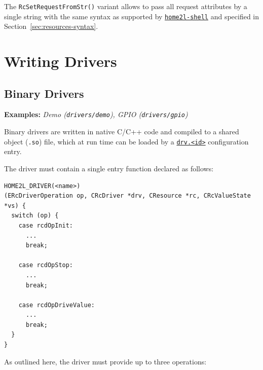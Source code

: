 \documentclass[12pt,english,parskip=half]{scrreprt}
\newcommand{\idx}[1]{#1\index{#1}}
\newcommand{\envref}[1]{\hyperref[env:#1]{\texttt{#1}}}        %
\newcommand{\toolref}[1]{\hyperref[tool:#1]{\texttt{\idx{#1}}}}
\begin{document}
The \texttt{RcSetRequestFromStr()} variant allows to pass all request attributes
by a single string with the same syntax as supported by
\toolref{home2l-shell} and specified in Section~\ref{sec:resources-syntax}.





%
\chapter{Writing Drivers}
\label{ch:drvdev}
%



\section{Binary Drivers}
\label{sec:drvdev-binary}


\textbf{Examples:} \emph{Demo (\texttt{drivers/demo}), GPIO (\texttt{drivers/gpio})}

Binary drivers are written in native C/C++ code and compiled to a shared
object (\texttt{.so}) file, which at run time can be loaded by a \envref{drv.<id>}
configuration entry.

The driver must contain a single entry function declared as follows:

\begin{lstlisting}
HOME2L_DRIVER(<name>) 
(ERcDriverOperation op, CRcDriver *drv, CResource *rc, CRcValueState *vs) {
  switch (op) {
    case rcdOpInit:
      ...
      break;

    case rcdOpStop:
      ...
      break;

    case rcdOpDriveValue:
      ...
      break;
  }
}
\end{lstlisting}

As outlined here, the driver must provide up to three operations:
\end{document}
